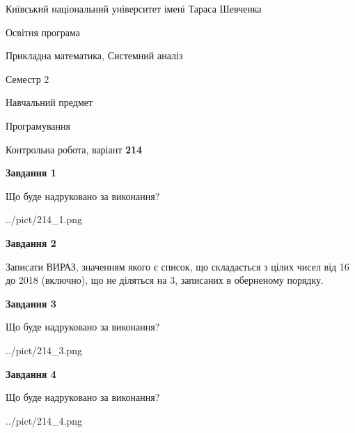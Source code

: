 \documentclass[12pt, ukrainian]{article}
\begin{document}
{{\begin {small}\par
{ \center  Київський національний університет імені Тараса Шевченка \par}
{\parbox {5 cm}{Освітня програма \hfill}{\parbox {8 cm}{Прикладна математика, Системний аналіз \hfill}}\parbox {5 cm}{\hfill Семестр 2}}\par
{\parbox {5 cm} {Навчальний предмет \hfill}\parbox {7 cm}{Програмування \hfill}\parbox {6cm}{\hfill}\par}\vspace{-7pt} \end{small}}{\center Контрольна робота, варіант  \No \textbf
{ 214 }\par}}
{
\begin {large}
{\begin {center}\textbf{Завдання 1}\end {center}}\par
Що буде надруковано за виконання?\par\par
\begin{center}
	{../pict/214_1.png}
\end{center}
\newpage

{\begin {center}\textbf{Завдання 2}\end {center}}\par

Записати ВИРАЗ, значенням якого є список, що складається з цілих чисел від 16 до 2018 (включно), що не діляться на 3, записаних в обернено\-му порядку.\par
\newpage

{\begin {center}\textbf{Завдання 3}\end {center}}\par
Що буде надруковано за виконання?
\begin{center}
	{../pict/214_3.png}
\end{center}
\newpage

{\begin {center}\textbf{Завдання 4}\end {center}}\par
Що буде надруковано за виконання?\par
\begin{center}
	{../pict/214_4.png}
\end{center}
\newpage


\end{large}}
\end{document}
